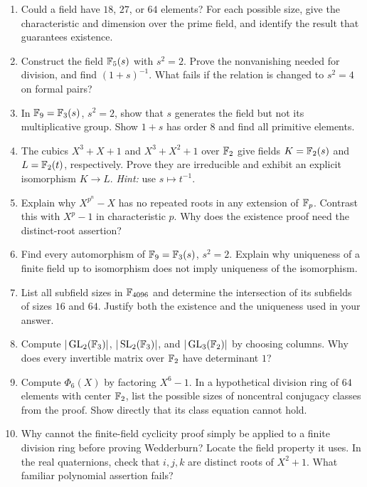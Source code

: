 \begin{exercisebox}
\begin{enumerate}
  \item Could a field have $18$, $27$, or $64$ elements? For each
  possible size, give the characteristic and dimension over the prime
  field, and identify the result that guarantees existence.
  \item Construct the field $\mathbb F_5(s)$ with $s^2=2$. Prove the
  nonvanishing needed for division, and find $(1+s)^{-1}$. What fails
  if the relation is changed to $s^2=4$ on formal pairs?
  \item In $\mathbb F_9=\mathbb F_3(s)$, $s^2=2$, show that $s$ generates the field
  but not its multiplicative group. Show $1+s$ has order $8$ and
  find all primitive elements. 
  \item The cubics $X^3+X+1$ and $X^3+X^2+1$ over $\mathbb F_2$ give
  fields $K=\mathbb F_2(s)$ and $L=\mathbb F_2(t)$, respectively. Prove they are
  irreducible and exhibit an explicit isomorphism $K\to L$.
  \emph{Hint:} use $s\mapsto t^{-1}$. 
  \item Explain why $X^{p^n}-X$ has no repeated roots in any extension
  of $\mathbb F_p$. Contrast this with $X^p-1$ in characteristic $p$.
  Why does the existence proof need the distinct-root assertion?
  \item Find every automorphism of $\mathbb F_9=\mathbb F_3(s)$, $s^2=2$.
  Explain why uniqueness of a finite field up to isomorphism does not
  imply uniqueness of the isomorphism. 
  \item List all subfield sizes in $\mathbb F_{4096}$ and determine the
  intersection of its subfields of sizes $16$ and $64$. Justify both
  the existence and the uniqueness used in your answer.
  \item Compute $|\operatorname{GL}_2(\mathbb F_3)|$,
  $|\operatorname{SL}_2(\mathbb F_3)|$, and
  $|\operatorname{GL}_3(\mathbb F_2)|$ by choosing columns. Why does every
  invertible matrix over $\mathbb F_2$ have determinant $1$?
  \item Compute $\Phi_6(X)$ by factoring $X^6-1$. In a hypothetical
  division ring of $64$ elements with center $\mathbb F_2$, list the possible
  sizes of noncentral conjugacy classes from the proof. Show directly
  that its class equation cannot hold. 
  \item Why cannot the finite-field cyclicity proof simply be applied
  to a finite division ring before proving Wedderburn? Locate the field
  property it uses. In the real quaternions, check that $i,j,k$ are
  distinct roots of $X^2+1$. What familiar polynomial assertion fails?
\end{enumerate}
\end{exercisebox}
